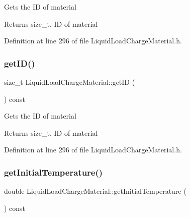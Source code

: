 Gets the ID of material \begin{DoxyReturn}{Returns}
size\+\_\+t, ID of material 
\end{DoxyReturn}


Definition at line 296 of file Liquid\+Load\+Charge\+Material.\+h.

\mbox{\label{class_liquid_load_charge_material_a07e869cabd98a5179536559a1c0f4b35}} 
\subsubsection{\texorpdfstring{get\+I\+D()}{getID()}\hspace{0.1cm}{\footnotesize\ttfamily [3/3]}}
{\footnotesize\ttfamily size\+\_\+t Liquid\+Load\+Charge\+Material\+::get\+ID (\begin{DoxyParamCaption}{ }\end{DoxyParamCaption}) const\hspace{0.3cm}{\ttfamily [inline]}}

Gets the ID of material \begin{DoxyReturn}{Returns}
size\+\_\+t, ID of material 
\end{DoxyReturn}


Definition at line 296 of file Liquid\+Load\+Charge\+Material.\+h.

\mbox{\label{class_liquid_load_charge_material_ab80229a78f884fb07e756665a616d401}} 
\subsubsection{\texorpdfstring{get\+Initial\+Temperature()}{getInitialTemperature()}\hspace{0.1cm}{\footnotesize\ttfamily [1/3]}}
{\footnotesize\ttfamily double Liquid\+Load\+Charge\+Material\+::get\+Initial\+Temperature (\begin{DoxyParamCaption}{ }\end{DoxyParamCaption}) const\hspace{0.3cm}{\ttfamily [inline]}}

